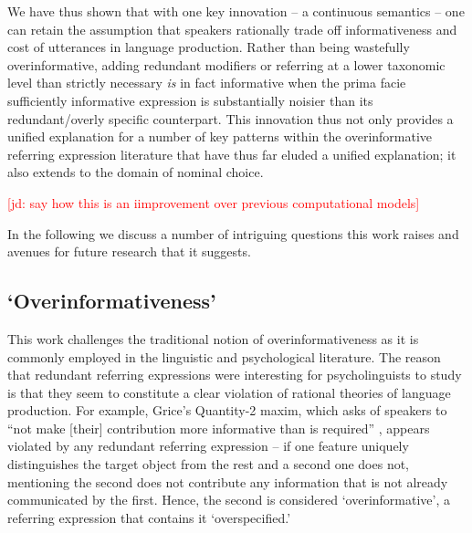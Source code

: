 \documentclass[11pt]{article}
\newcommand{\jd}[1]{\textcolor{Red}{[jd: #1]}}
\begin{document}
We have thus shown that with one key innovation -- a continuous semantics  -- one can retain the assumption that speakers rationally trade off informativeness and cost of utterances in language production. Rather than being wastefully overinformative, adding redundant modifiers or referring at a lower taxonomic level than strictly necessary \emph{is} in fact informative when the prima facie sufficiently informative expression is substantially noisier than its redundant/overly specific counterpart. This innovation thus not only provides a unified explanation for a number of key patterns within the overinformative referring expression literature that have thus far eluded a unified explanation; it also extends to the domain of nominal choice.

\jd{say how this is an iimprovement over previous computational models}

In the following we discuss a number of intriguing questions this work raises and avenues for future research that it suggests.

\subsection{`Overinformativeness'}

This work challenges the traditional notion of overinformativeness as it is commonly employed in the linguistic and psychological literature. The reason that redundant referring expressions were interesting for psycholinguists to study is that they seem to constitute a clear violation of rational theories of language production. For example, Grice's Quantity-2 maxim, which asks of speakers to ``not make [their] contribution more informative than is required'' \cite{grice1975}, appears violated by any redundant referring expression -- if one feature uniquely distinguishes the target object from the rest and a second one does not, mentioning the second does not contribute any information that is not already communicated by the first. Hence, the second is considered `overinformative', a referring expression that contains it  `overspecified.'
\end{document}
